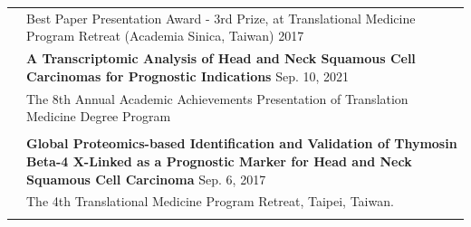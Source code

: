 \documentclass[letterpaper, 11pt]{article}
\begin{document}
\begin{longtable}{p{1.3in}p{4.8in}}

{\color{OliveGreen}{Honors and award}} 
& Best Paper Presentation Award - 3rd Prize, at Translational Medicine
Program Retreat (Academia Sinica, Taiwan) \hfill 2017\\




 


{\color{OliveGreen}{Presentation}} 
& \textbf{A Transcriptomic Analysis of Head and Neck Squamous Cell Carcinomas for Prognostic Indications} \hfill Sep. 10, 2021 \\
& The 8th Annual Academic Achievements Presentation of Translation Medicine Degree Program \\
& \\

& \textbf{Global Proteomics-based Identification
and Validation of Thymosin Beta-4 X-Linked as a Prognostic Marker for Head
and Neck Squamous Cell Carcinoma} \hfill Sep. 6, 2017 \\
& The 4th Translational Medicine
Program Retreat, Taipei, Taiwan. \\
& \\


\end{longtable}
\end{document}
